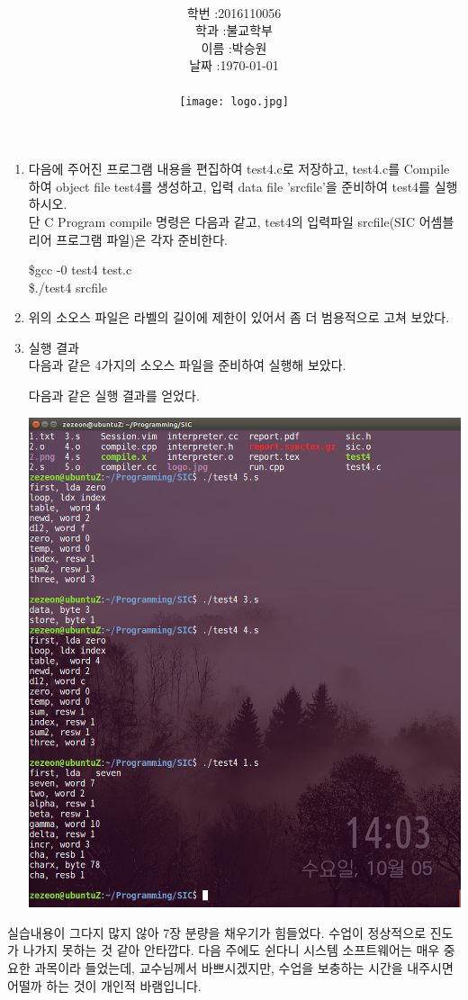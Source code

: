 \documentclass[12pt,a4paper]{article}
\title{
	\centering
	\pgfornament[width=12cm,color=teal]{84}\\
	\vspace{1cm}
	\fontsize{50}{50} \selectfont {시스템 S/W 실습4}\\
	\pgfornament[width=12cm,color=teal]{88}\\
	\vfill}
\author{
	\LARGE
	\begin{tabular}{rl}
		\hline
		학번 : & 2016110056\\ 
		학과 : & 불교학부 \\
		이름 : & 박승원\\
		날짜 : & \today\\
		\hline
	\end{tabular}\vspace{2cm}
	\\
	\texttt{[image: logo.jpg]}
}
\date{}
\begin{document}
\maketitle
\noindent
\lstset{columns=flexible, tabsize=4, frame=single, showstringspaces=false, breaklines=true, upquote=true, basicstyle=\ttfamily\normal}
\begin{enumerate}


\lstset{language=C}
\item 다음에 주어진 프로그램 내용을 편집하여 test4.c로 저장하고, test4.c를 Compile 하여 object file test4를 생성하고, 입력 data file 'srcfile'을 준비하여 test4를 실행하시오. \\
단 C Program compile 명령은 다음과 같고, test4의 입력파일 srcfile(SIC 어셈블리어 프로그램 파일)은 각자 준비한다.

\$gcc -0 test4 test.c\\
\$./test4 srcfile



\item 위의 소오스 파일은 라벨의 길이에 제한이 있어서 좀 더 범용적으로 고쳐 보았다.



\item 실행 결과
\\다음과 같은 4가지의 소오스 파일을 준비하여 실행해 보았다.


다음과 같은 실행 결과를 얻었다.

\includegraphics[width=\textwidth]{1.png}

\end{enumerate}

{}
\indent
실습내용이 그다지 많지 않아 7장 분량을 채우기가 힘들었다. 수업이 정상적으로 진도가 나가지 못하는 것 같아 안타깝다. 다음 주에도 쉰다니 시스템 소프트웨어는 매우 중요한 과목이라 들었는데, 교수님께서 바쁘시겠지만, 수업을 보충하는 시간을 내주시면 어떨까 하는 것이 개인적 바램입니다.
\end{document}
